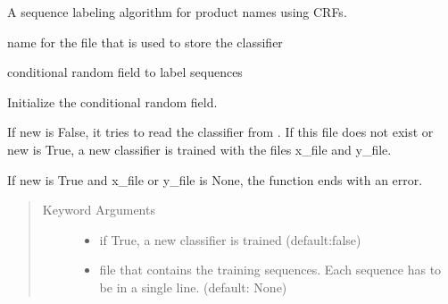 \documentclass[letterpaper,10pt,english]{sphinxmanual}
\begin{document}
\begin{fulllineitems}
\label{\detokenize{api:product_crf.ProductnameCRF}}
A sequence labeling algorithm for product names using CRFs.

\begin{fulllineitems}
\label{\detokenize{api:product_crf.ProductnameCRF.filename}}
name for the file that is used to store the classifier

\end{fulllineitems}


\begin{fulllineitems}
\label{\detokenize{api:product_crf.ProductnameCRF.crf}}
conditional random field to label sequences

\end{fulllineitems}


\begin{fulllineitems}
\label{\detokenize{api:product_crf.ProductnameCRF.__init__}}
Initialize the conditional random field.

If new is False, it tries to read the classifier from
. If this file does not exist or new is True, a
new classifier is trained with the files x\_file and y\_file.

If new is True and x\_file or y\_file is None, the function ends
with an error.
\begin{quote}\begin{description}
\item[{Keyword Arguments}] \leavevmode\begin{itemize}
\item {} 
 \textendash{} if True, a new classifier is trained (default:false)

\item {} 
 \textendash{} file that contains the training sequences. Each
sequence has to be in a single line. (default: None)


\end{itemize}
\end{description}
\end{quote}
\end{fulllineitems}
\end{fulllineitems}
\end{document}
